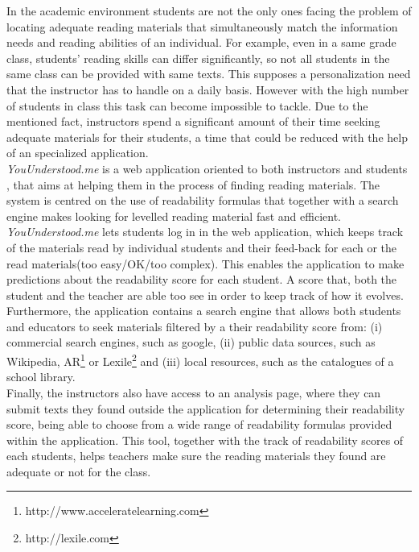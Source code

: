 \documentclass{sig-alternate-05-2015}
\begin{document}


In the academic environment students are not the only ones facing the problem of locating adequate reading materials that simultaneously match the information needs and reading abilities of an individual. For example, even in a same grade class, students' reading skills can differ significantly, so not all students in the same class can be provided with same texts. This supposes a personalization need that the instructor has to handle on a daily basis. However with the high number of students in class this task can become impossible to tackle. Due to the mentioned fact, instructors spend a significant amount of their time seeking adequate materials for their students, a time that could be reduced with the help of an specialized application.\\


\textit{YouUnderstood.me} is a web application oriented to both instructors and students , that aims at helping them in the process of finding reading materials. The system is centred on the use of readability formulas that together with a search engine makes looking for levelled reading material fast and efficient. \textit{YouUnderstood.me} lets students log in in the web application, which keeps track of the materials read by individual students and their feed-back for each or the read materials(too easy/OK/too complex). This enables the application to make predictions about the readability score for each student. A score that, both the student and the teacher are able too see in order to keep track of how it evolves. Furthermore, the application contains a search engine that allows both students and educators to seek materials filtered by a their readability score from: (i) commercial search engines, such as google, (ii) public data sources, such as Wikipedia, AR\footnote{http://www.acceleratelearning.com} or Lexile\footnote{http://lexile.com}  and (iii) local resources, such as the catalogues of a school library.\\

Finally, the instructors also have access to an analysis page, where they can submit texts they found outside the application for determining their readability score, being able to choose from a wide range of readability formulas provided within the application. This tool, together with the track of readability scores of each students, helps teachers make sure the reading materials they found are adequate or not for the class.
\end{document}
